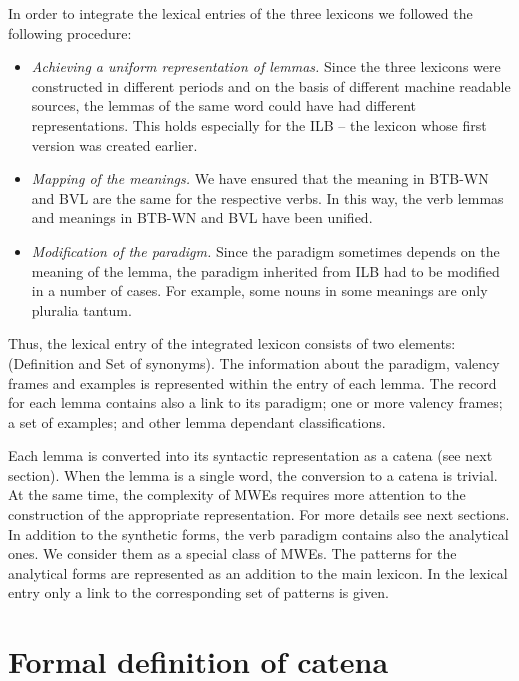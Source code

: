 \documentclass[output=paper,colorlinks,citecolor=brown]{langscibook}
\begin{document}
In order to integrate the lexical entries of the three lexicons we followed the following procedure:
\begin{itemize}
    \item {\itshape Achieving a uniform representation of lemmas.} Since the three lexicons were constructed in different periods and on the basis of different machine readable sources, the lemmas of the same word could have had different representations. This holds especially for the ILB -- the lexicon whose first version was created earlier.
    \item {\itshape Mapping of the meanings.} We have ensured that the meaning in BTB-WN and BVL are the same for the respective verbs. In this way, the verb lemmas and meanings in BTB-WN and BVL have been unified.
    \item {\itshape Modification of the paradigm.} Since the paradigm sometimes depends on the meaning of the lemma, the paradigm inherited from ILB had to be modified in a number of cases. For example, some nouns in some meanings are only pluralia tantum.
\end{itemize}

Thus, the lexical entry of the integrated lexicon consists of two elements: ({Definition} and {Set of synonyms}). The information about the paradigm, valency frames and examples is represented within the entry of each lemma. The record for each lemma contains also a link to its paradigm; one or more valency frames; a set of examples; and other lemma dependant classifications.

Each lemma is converted into its syntactic representation as a catena (see next section). When the lemma is a single word, the conversion to a catena is trivial. At the same time, the complexity of MWEs requires more attention to the construction of the appropriate representation. For more details see next sections.
In addition to the synthetic forms, the verb paradigm contains also the analytical ones. We consider them as a special class of MWEs. The patterns for the analytical forms are represented as an addition to the main lexicon. In the lexical entry only a link to the corresponding set of patterns is given. 


\section{Formal definition of catena}\label{FDCatenaOS}\largerpage
\end{document}
